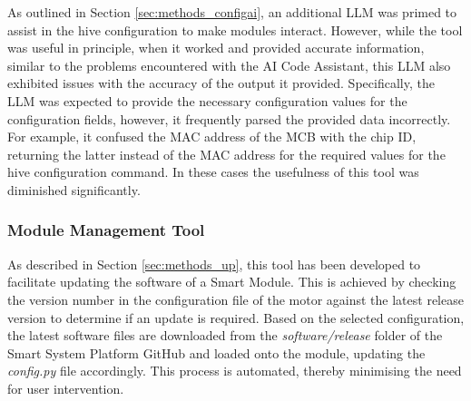 As outlined in Section \ref{sec:methods_configai}, an additional LLM was primed to assist in the hive configuration to make modules interact. However, while the tool was useful in principle, when it worked and provided accurate information, similar to the problems encountered with the AI Code Assistant, this LLM also exhibited issues with the accuracy of the output it provided. Specifically, the LLM was expected to provide the necessary configuration values for the configuration fields, however, it frequently parsed the provided data incorrectly. For example, it confused  the MAC address of the MCB with the chip ID, returning the latter instead of the MAC address for the required values for the hive configuration command. In these cases the usefulness of this tool was diminished significantly.

\subsubsection{\label{sec:res_mmt}Module Management Tool}

As described in Section \ref{sec:methods_up}, this tool has been developed to facilitate updating the software of a Smart Module. This is achieved by checking the version number in the configuration file of the motor against the latest release version to determine if an update is required. Based on the selected configuration, the latest software files are downloaded from the \textit{software/release} folder of the Smart System Platform GitHub and loaded onto the module, updating the \textit{config.py} file accordingly. This process is automated, thereby minimising the need for user intervention.







